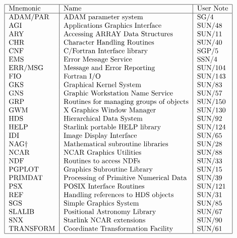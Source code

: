 \begin{table}[htb]\caption{Starlink libraries available on
Unix}\label{libraries}
\[\begin{tabular}{|l|l|l|}
\hline
Mnemonic &Name &User Note\\
\hline
ADAM/PAR  & ADAM parameter system                  & SG/4    \\
AGI       & Applications Graphics Interface        & SUN/48  \\
ARY       & Accessing ARRAY Data Structures        & SUN/11  \\
CHR       & Character Handling Routines            & SUN/40  \\
CNF       & C/Fortran Interface library            & SGP/5   \\
EMS       & Error Message Service                  & SSN/4   \\
ERR/MSG   & Message and Error Reporting            & SUN/104 \\
FIO       & Fortran I/O                            & SUN/143 \\
GKS       & Graphical Kernel System                & SUN/83  \\
GNS       & Graphic Workstation Name Service       & SUN/57  \\
GRP       & Routines for managing groups of objects & SUN/150  \\
GWM       & X Graphics Window Manager              & SUN/130 \\
HDS       & Hierarchical Data System               & SUN/92  \\

HELP      & Starlink portable HELP library         & SUN/124 \\
IDI       & Image Display Interface                & SUN/65  \\
NAG\dag   & Mathematical subroutine libraries      & SUN/28  \\
NCAR      & NCAR Graphics Utilities                 & SUN/88  \\
NDF       & Routines to access NDFs                & SUN/33  \\
PGPLOT    & Graphics Subroutine Library            & SUN/15  \\
PRIMDAT   & Processing of Primitive Numerical Data & SUN/39  \\
PSX       & POSIX Interface Routines               & SUN/121 \\
REF       & Handling references to HDS objects     & SUN/31  \\
SGS       & Simple Graphics System                 & SUN/85  \\
SLALIB    & Positional Astronomy Library           & SUN/67  \\
SNX       & Starlink NCAR extensions               & SUN/90 \\
TRANSFORM & Coordinate Transformation Facility     & SUN/61  \\
\hline
\end{tabular}\]
\end{table}


